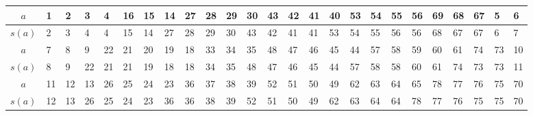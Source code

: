 \begin{center}
\begin{minipage}{\textwidth}
\renewcommand{\arraystretch}{1.2}
\begin{scriptsize}
\begin{tabular}{|c|*{24}{|p{.15cm}}|}
\hline
$a$&1&2&3&4&16&15&14&27&28&29&30&43&42&41&40&53&54&55&56&69&68&67&5&6 \\
\hline
$s(a)$&2&3&4&4&15&14&27&28&29&30&43&42&41&41&53&54&55&56&56&68&67&67&6&7\\
\hline \hline
$a$&7&8&9&22&21&20&19&18&33&34&35&48&47&46&45&44&57&58&59&60&61&74&73&10\\
\hline
$s(a)$&8&9&22&21&21&19&18&18&34&35&48&47&46&45&44&57&58&58&60&61&74&73&73&11\\
\hline \hline
$a$&11&12&13&26&25&24&23&36&37&38&39&52&51&50&49&62&63&64&65&78&77&76&75&70\\
\hline
$s(a)$&12&13&26&25&24&23&36&36&38&39&52&51&50&49&62&63&64&64&78&77&76&75&75&70\\
\hline
\end{tabular}
\label{Beispiel_HF_Zickzack_unterteilt}
\end{scriptsize} 
\renewcommand{\arraystretch}{1}


\end{minipage}
\end{center}

